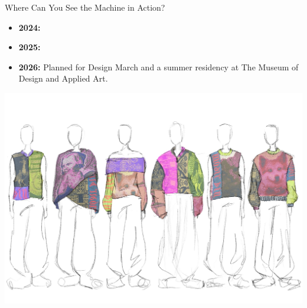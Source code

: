 \documentclass[
    NAME={Dr. Helga Ingimundardóttir},
    EMAIL={helgaingim@hi.is},
    FACULTY={Industrial Engineering},
    TITLE={HiDef Textiles: Reviving Tradition with Innovation},
    SUBTITLE={Empowering Creativity and Sustainability in Textile Production through Digital Transformation},
    SEMINAR={Reykjavík DataBeers},
    DATE={January 25, 2025},
    WIDE={true}
]{HI-LaTeX/hi-beamer}
\begin{document}
    \begin{frame}{Where Can You See the Machine in Action?}
        \begin{itemize}
            \item \textbf{2024:} 
            \item \textbf{2025:}
            
            \item \textbf{2026:} Planned for \alert{Design March} and a summer residency at \alert{The Museum of Design and Applied Art}.
        \end{itemize}
        \includegraphics[width=\textwidth, trim=0 0 0 180pt, clip]{include/gisa.JPG}
    \end{frame}
\end{document}
